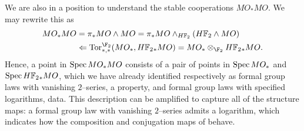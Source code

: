 \begin{remark}
We are also in a position to understand the stable cooperations $MO_* MO$.  We may rewrite this as
\begin{align*}
MO_* MO & = \pi_* MO \sm MO = \pi_* MO \sm_{\HFtwo} (\HFtwo \sm MO) \\
& \Leftarrow \Tor^{\F_2}_{*, *}(MO_*, \HFtwo{}_* MO) = MO_* \otimes_{\F_2} \HFtwo{}_* MO.
\end{align*}
Hence, a point in $\operatorname{Spec} MO_* MO$ consists of a pair of points in $\operatorname{Spec} MO_*$ and $\Spec \HFtwo_* MO$, which we have already identified respectively as formal group laws with vanishing $2$--series, a property, and formal group laws with specified logarithms, data.  This description can be amplified to capture all of the structure maps: a formal group law with vanishing $2$--series admits a logarithm, which indicates how the composition and conjugation maps of  behave.
\end{remark}



